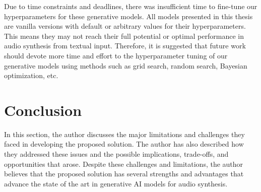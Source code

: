 Due to time constraints and deadlines, there was insufficient time to fine-tune our hyperparameters for these generative models. All models presented in this thesis are vanilla versions with default or arbitrary values for their hyperparameters. This means they may not reach their full potential or optimal performance in audio synthesis from textual input. Therefore, it is suggested that future work should devote more time and effort to the hyperparameter tuning of our generative models using methods such as grid search, random search, Bayesian optimization, etc.

\section{Conclusion}

In this section, the author discusses the major limitations and challenges they faced in developing the proposed solution. The author has also described how they addressed these issues and the possible implications, trade-offs, and opportunities that arose. Despite these challenges and limitations, the author believes that the proposed solution has several strengths and advantages that advance the state of the art in generative \ac{AI} models for audio synthesis.